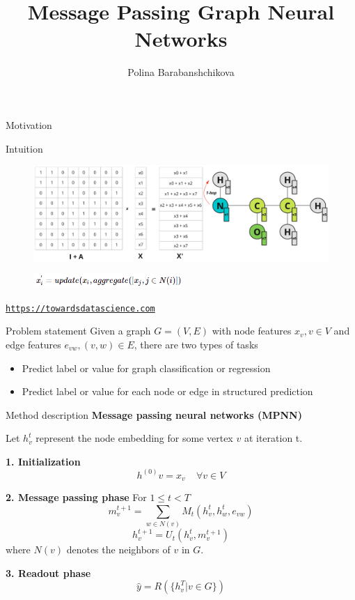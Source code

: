 \documentclass[13pt]{beamer}				\usepackage{graphicx}
\title[Message Passing Graph Neural Networks]{Message Passing Graph Neural Networks}
\author[Polina Barabanshchikova]{Polina Barabanshchikova}
\institute[MIPT]{MIPT}
\begin{document}
\begin{frame}
  \titlepage
\end{frame}

\begin{frame}{Motivation}
\end{frame}

\begin{frame}{Intuition}
\begin{figure}[h!]
    \includegraphics[width=1\textwidth, trim={0 0 0 0cm},clip]{mpnn1.png}
\end{figure}
\begin{figure}[h!]
    \includegraphics[width=0.5\textwidth, trim={0 0 0 0cm},clip]{mpnn2.png}
\end{figure}
\href{https://towardsdatascience.com/the-intuition-behind-graph-convolutions-and-message-passing-6dcd0ebf0063}{\tiny{\nolinkurl{https://towardsdatascience.com}}}
\end{frame}

\begin{frame}{Problem statement}
Given a graph $G = (V, E)$ with node features $x_v, v\in V$ and edge features $e_{v w}, (v, w) \in E$, there are two types of tasks
\begin{itemize}
\item Predict label or value for graph classification or regression
\item Predict label or value for each node or edge in structured prediction
\end{itemize}
\end{frame}

\begin{frame}{Method description}
\textbf{Message passing neural networks (MPNN)}

Let $h^t_v$ represent the node embedding for some vertex $v$ at iteration t.

\textbf{1. Initialization}
$$h^{(0)}v = x_v \;\;\;\; \forall v \in V$$
\pause

\textbf{2. Message passing phase}
For $1 \leq t < T$
$$m_v^{t+1} = \sum \limits_{w \in N(v)} M_t(h_v^t, h_w^t, e_{vw})$$
$$h_v^{t+1} = U_t(h_v^t, m_v^{t+1})$$
where $N(v)$ denotes the neighbors of $v$ in $G$.
\pause

\textbf{3. Readout phase}
$$\hat{y} = R(\{h_v^T | v \in G\})$$
\end{frame}
\end{document}
